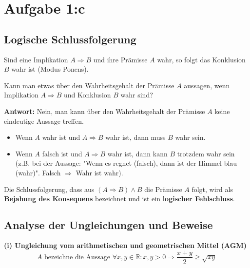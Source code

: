 \documentclass{article}
\begin{document}
\section*{Aufgabe 1:c}

\subsection*{Logische Schlussfolgerung}
Sind eine Implikation $A \Rightarrow B$ und ihre Prämisse $A$ wahr, so folgt das Konklusion $B$ wahr ist (Modus Ponens).

Kann man etwas über den Wahrheitsgehalt der Prämisse $A$ aussagen, wenn Implikation $A \Rightarrow B$ und Konklusion $B$ wahr sind?
\bigskip

\textbf{Antwort:}
Nein, man kann über den Wahrheitsgehalt der Prämisse $A$ keine eindeutige Aussage treffen.
\begin{itemize}
    \item Wenn $A$ wahr ist und $A \Rightarrow B$ wahr ist, dann muss $B$ wahr sein.
    \item Wenn $A$ falsch ist und $A \Rightarrow B$ wahr ist, dann kann $B$ trotzdem wahr sein (z.B. bei der Aussage: "Wenn es regnet (falsch), dann ist der Himmel blau (wahr)". Falsch $\Rightarrow$ Wahr ist wahr).
\end{itemize}
Die Schlussfolgerung, dass aus $(A \Rightarrow B) \land B$ die Prämisse $A$ folgt, wird als \textbf{Bejahung des Konsequens} bezeichnet und ist ein \textbf{logischer Fehlschluss}.

\bigskip
\bigskip

\subsection*{Analyse der Ungleichungen und Beweise}

\textbf{(i) Ungleichung vom arithmetischen und geometrischen Mittel (AGM)}
\[
    A \text{ bezeichne die Aussage } \forall x, y \in \mathbb{R}: x, y > 0 \Rightarrow \frac{x+y}{2} \geq \sqrt{xy}
\]
\end{document}

